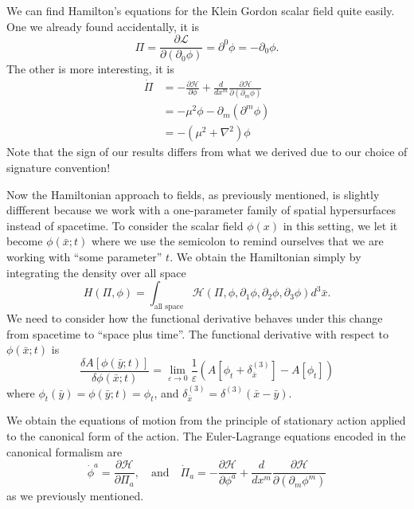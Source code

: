 \begin{ex}
\begin{small}
We can find Hamilton's equations for the Klein Gordon scalar
field quite easily. One we already found accidentally, it is
\begin{equation}%
\Pi = \frac{\partial\mathcal{L}}{\partial(\partial_{0}\phi)} =
\partial^{0}\phi = -\partial_{0}\phi.
\end{equation}
The other is more interesting, it is
\begin{subequations}
\begin{align}
\dot{\Pi} &= -\frac{\partial\mathcal{H}}{\partial\phi}+\frac{d}{dx^{m}}\frac{\partial\mathcal{H}}{\partial(\partial_{m}\phi)}\\
&= -\mu^{2}\phi - \partial_{m}(\partial^{m}\phi)\\
&= -(\mu^{2}+\nabla^{2})\phi
\end{align}
\end{subequations}
Note that the sign of our results differs from what we derived
due to our choice of signature convention!
\end{small}\end{ex}

Now the Hamiltonian approach to fields, as previously mentioned,
is slightly diffferent because we work with a one-parameter
family of spatial hypersurfaces instead of spacetime. To consider
the scalar field $\phi(x)$ in this setting, we let it become
$\phi(\bar{x};t)$ where we use the semicolon to remind ourselves
that we are working with ``some parameter'' $t$. We obtain the
Hamiltonian simply by integrating the density over all space
\begin{equation}%
H(\Pi,\phi) = \int_{\text{all space}}\mathcal{H}(\Pi,\phi,\partial_{1}\phi,\partial_{2}\phi,\partial_{3}\phi)d^{3}\bar{x}.
\end{equation}
We need to consider how the functional derivative behaves under
this change from spacetime to ``space plus time''. The functional
derivative with respect to $\phi(\bar{x};t)$ is
\begin{equation}%
\frac{\delta A[\phi(\bar{y};t)]}{\delta\phi(\bar{x};t)} = \lim_{\varepsilon\to0}\frac{1}{\varepsilon}\left(A[\phi_{t}+\delta^{(3)}_{\bar{x}}]-A[\phi_{t}]\right)
\end{equation}
where $\phi_{t}(\bar{y})=\phi(\bar{y};t)=\phi_{t}$, and $\delta^{(3)}_{\bar{x}}=\delta^{(3)}(\bar{x}-\bar{y})$.

We obtain the equations of motion from the principle of
stationary action applied to the canonical form of the
action. The Euler-Lagrange equations encoded in the canonical
formalism are
\begin{equation}%
\dot{\phi}^{a} =
\frac{\partial\mathcal{H}}{\partial\Pi_{a}},\quad\text{and}\quad\dot{\Pi}_{a}
= -\frac{\partial\mathcal{H}}{\partial\phi^{a}}+\frac{d}{dx^{m}}\frac{\partial\mathcal{H}}{\partial(\partial_{m}\phi^{m})}
\end{equation}
as we previously mentioned.

